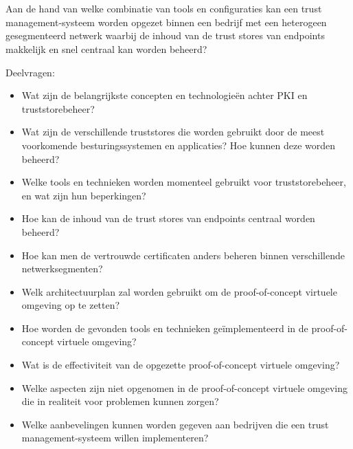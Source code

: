 \section{}%
\label{sec:onderzoeksvraag}

Aan de hand van welke combinatie van tools en configuraties kan een trust management-systeem worden opgezet binnen een bedrijf met een heterogeen gesegmenteerd netwerk waarbij de inhoud van de trust stores van endpoints makkelijk en snel centraal kan worden beheerd?

Deelvragen:
\begin{itemize}
    \item Wat zijn de belangrijkste concepten en technologieën achter PKI en truststorebeheer? 
    \item Wat zijn de verschillende truststores die worden gebruikt door de meest voorkomende besturingssystemen en applicaties? Hoe kunnen deze worden beheerd?
    \item Welke tools en technieken worden momenteel gebruikt voor truststorebeheer, en wat zijn hun beperkingen? 
    \item Hoe kan de inhoud van de trust stores van endpoints centraal worden beheerd?
    \item Hoe kan men de vertrouwde certificaten anders beheren binnen verschillende netwerksegmenten?
    \item Welk architectuurplan zal worden gebruikt om de proof-of-concept virtuele omgeving op te zetten?
    \item Hoe worden de gevonden tools en technieken geïmplementeerd in de proof-of-concept virtuele omgeving?
    \item Wat is de effectiviteit van de opgezette proof-of-concept virtuele omgeving?
    \item Welke aspecten zijn niet opgenomen in de proof-of-concept virtuele omgeving die in realiteit voor problemen kunnen zorgen?
    \item Welke aanbevelingen kunnen worden gegeven aan bedrijven die een trust management-systeem willen implementeren?
\end{itemize}

\section{}%
\label{sec:onderzoeksdoelstelling}

